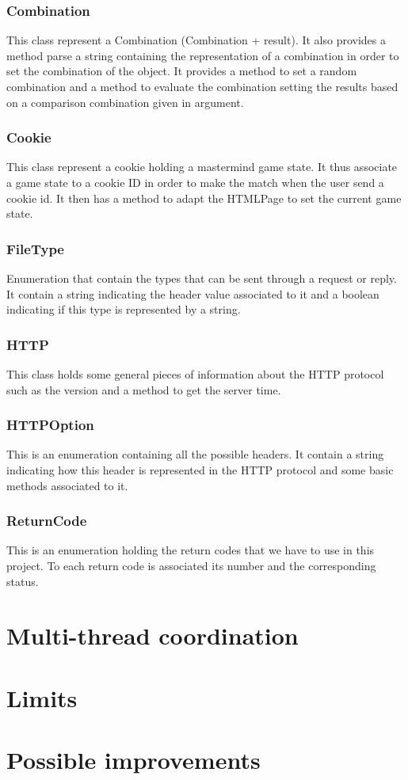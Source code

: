 \documentclass[11pt]{article}
\begin{document}
\subsubsection{Combination}
This class represent a Combination (Combination + result). It also provides a method parse a string containing the representation of a combination in order to set the combination of the object. It provides a method to set a random combination and a method to evaluate the combination setting the results based on a comparison combination given in argument.

\subsubsection{Cookie}
This class represent a cookie holding a mastermind game state. It thus associate a game state to a cookie ID in order to make the match when the user send a cookie id. It then has a method to adapt the HTMLPage to set the current game state.

\subsubsection{FileType}
Enumeration that contain the types that can be sent through a request or reply. It contain a string indicating the header value associated to it and a boolean indicating if this type is represented by a string.

\subsubsection{HTTP}
This class holds some general pieces of information about the HTTP protocol such as the version and a method to get the server time.

\subsubsection{HTTPOption}
This is an enumeration containing all the possible headers. It contain a string indicating how this header is represented in the HTTP protocol and some basic methods associated to it.

\subsubsection{ReturnCode}
This is an enumeration holding the return codes that we have to use in this project. To each return code is associated its number and the corresponding status.

\section{Multi-thread coordination}

\section{Limits}

\section{Possible improvements}
\end{document}
